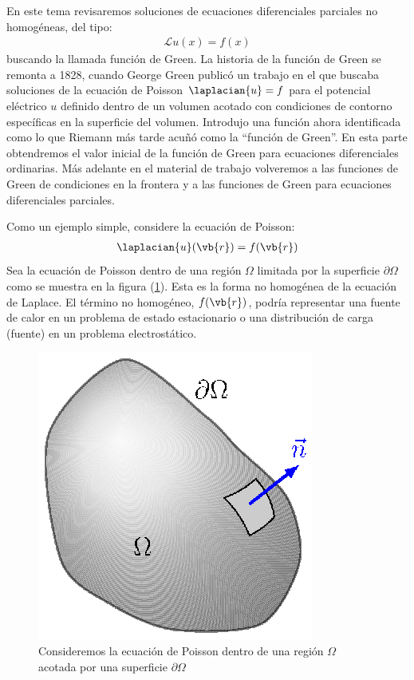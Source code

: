 En este tema revisaremos soluciones de ecuaciones diferenciales parciales no homogéneas, del tipo:
\begin{align*}
\mathcal{L} u (x) = f (x)
\end{align*}
buscando la llamada función de Green. La historia de la función de Green se remonta a 1828, cuando George Green publicó un trabajo en el que buscaba soluciones de la ecuación de Poisson $\laplacian{u} = f$ para el potencial eléctrico $u$ definido dentro de un volumen acotado con condiciones de contorno específicas en la superficie del volumen. Introdujo una función ahora identificada como lo que Riemann más tarde acuñó como la \enquote{función de Green}. En esta parte obtendremos el valor inicial de la función de Green para ecuaciones diferenciales ordinarias. Más adelante en el material de trabajo volveremos a las funciones de Green de condiciones en la frontera y a las funciones de Green para ecuaciones diferenciales parciales.
\par
Como un ejemplo simple, considere la ecuación de Poisson:
\begin{align*}
\laplacian{u} (\vb{r}) = f (\vb{r})
\end{align*}
Sea la ecuación de Poisson dentro de una región $\Omega$ limitada por la superficie $\partial \Omega$ como se muestra en la figura (\ref{fig:figura_07_01}). Esta es la forma no homogénea de la ecuación de Laplace. El término no homogéneo, $f (\vb{r})$, podría representar una fuente de calor en un problema de estado estacionario o una distribución de carga (fuente) en un problema electrostático.
\begin{figure}[H]
    \centering
    \includegraphics[scale=1]{Imagenes/Funcion_Green_01.eps}
    \caption{Consideremos la ecuación de Poisson dentro de una región $\Omega$ acotada por una superficie $\partial \Omega$}
    \label{fig:figura_07_01}
\end{figure}
